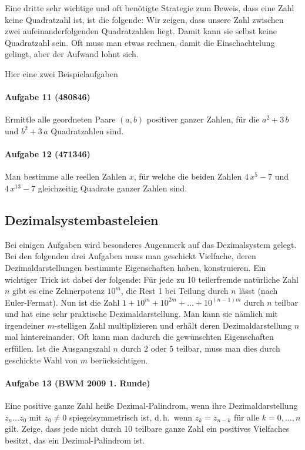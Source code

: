 \documentclass[11pt,a4paper]{article}
\begin{document}
Eine dritte sehr wichtige und oft benötigte Strategie zum Beweis, dass eine
Zahl keine Quadratzahl ist, ist die folgende: Wir zeigen, dass unsere Zahl
zwischen zwei aufeinanderfolgenden Quadratzahlen liegt. Damit kann sie selbst
keine Quadratzahl sein. Oft muss man etwas rechnen, damit die Einschachtelung
gelingt, aber der Aufwand lohnt sich.

Hier eine zwei Beispielaufgaben

\paragraph{Aufgabe 11 (480846)} 
Ermittle alle geordneten Paare $(a,b)$ positiver ganzer Zahlen, für die
$a^{2}+3\,b$ und $b^2+3\,a$ Quadratzahlen sind.

\paragraph{Aufgabe 12 (471346)} 
Man bestimme alle reellen Zahlen $x$, für welche die beiden Zahlen
$4\,x^{5}-7$ und $4\,x^{13}-7$ gleichzeitig Quadrate ganzer Zahlen sind.

\subsection*{Dezimalsystembasteleien}

Bei einigen Aufgaben wird besonderes Augenmerk auf das Dezimalsystem gelegt.
Bei den folgenden drei Aufgaben muss man geschickt Vielfache, deren
Dezimaldarstellungen bestimmte Eigenschaften haben, konstruieren. Ein
wichtiger Trick ist dabei der folgende: Für jede zu 10 teilerfremde natürliche
Zahl $n$ gibt es eine Zehnerpotenz $10^{m}$, die Rest 1 bei Teilung durch $n$
lässt (nach Euler-Fermat). Nun ist die Zahl
$1+10^{m}+10^{2m}+\dots+10^{(n-1)m}$ durch $n$ teilbar und hat eine sehr
praktische Dezimaldarstellung. Man kann sie nämlich mit irgendeiner
$m$-stelligen Zahl multiplizieren und erhält deren Dezimaldarstellung $n$ mal
hintereinander. Oft kann man dadurch die gewünschten Eigenschaften
erfüllen. Ist die Ausgangszahl $n$ durch 2 oder 5 teilbar, muss man dies durch
geschickte Wahl von $m$ berücksichtigen.

\paragraph{Aufgabe 13  (BWM 2009 1. Runde)} 
Eine positive ganze Zahl heiße Dezimal-Palindrom, wenn ihre Dezimaldarstellung
$z_{n}\dots z_{0}$ mit $z_{0}\neq 0$ spiegelsymmetrisch ist, d.\,h.\ wenn
$z_{k}=z_{n-k}$ für alle $k=0,\dots,n$ gilt. Zeige, dass jede nicht durch 10
teilbare ganze Zahl ein positives Vielfaches besitzt, das ein
Dezimal-Palindrom ist.
\end{document}
